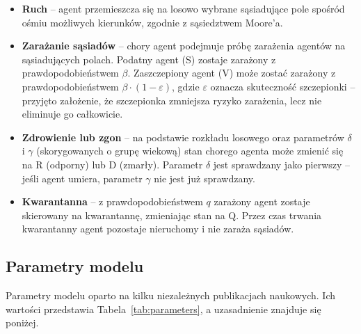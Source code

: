 \documentclass[polish]{projectreport}
\begin{document}
\begin{itemize}
    \item \textbf{Ruch} -- agent przemieszcza się na losowo wybrane
    sąsiadujące pole spośród ośmiu możliwych kierunków, zgodnie
    z sąsiedztwem Moore'a.

    \item \textbf{Zarażanie sąsiadów} -- chory agent podejmuje próbę
    zarażenia agentów na sąsiadujących polach. Podatny agent (S)
    zostaje zarażony z prawdopodobieństwem $\beta$. Zaszczepiony
    agent (V) może zostać zarażony z prawdopodobieństwem
    $\beta \cdot (1 - \varepsilon)$, gdzie $\varepsilon$ oznacza
    skuteczność szczepionki -- przyjęto założenie, że szczepionka
    zmniejsza ryzyko zarażenia, lecz nie eliminuje go całkowicie.

    \item \textbf{Zdrowienie lub zgon} -- na podstawie rozkładu
    losowego oraz parametrów $\delta$ i $\gamma$ (skorygowanych
    o grupę wiekową) stan chorego agenta może zmienić się na R
    (odporny) lub D (zmarły). Parametr $\delta$ jest sprawdzany
    jako pierwszy -- jeśli agent umiera, parametr $\gamma$ nie
    jest już sprawdzany.

    \item \textbf{Kwarantanna} -- z prawdopodobieństwem $q$ zarażony
    agent zostaje skierowany na kwarantannę, zmieniając stan na Q.
    Przez czas trwania kwarantanny agent pozostaje nieruchomy
    i nie zaraża sąsiadów.
\end{itemize}





\subsection{Parametry modelu}
\label{sec:parameters}

Parametry modelu oparto na kilku niezależnych publikacjach naukowych.
Ich wartości przedstawia Tabela~\ref{tab:parameters}, a uzasadnienie
znajduje się poniżej.
\end{document}
